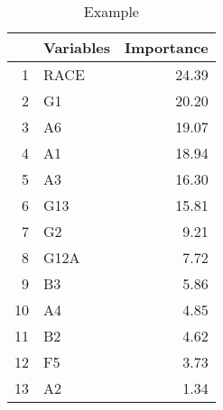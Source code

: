 \begin{table}[ht]
\centering
\begin{tabular}{rlr}
  \toprule
 & Variables & Importance \\ 
  \midrule
1 & RACE & 24.39 \\ 
  2 & G1 & 20.20 \\ 
  3 & A6 & 19.07 \\ 
  4 & A1 & 18.94 \\ 
  5 & A3 & 16.30 \\ 
  6 & G13 & 15.81 \\ 
  7 & G2 & 9.21 \\ 
  8 & G12A & 7.72 \\ 
  9 & B3 & 5.86 \\ 
  10 & A4 & 4.85 \\ 
  11 & B2 & 4.62 \\ 
  12 & F5 & 3.73 \\ 
  13 & A2 & 1.34 \\ 
   \bottomrule
\end{tabular}
\caption{Example} 
\end{table}
